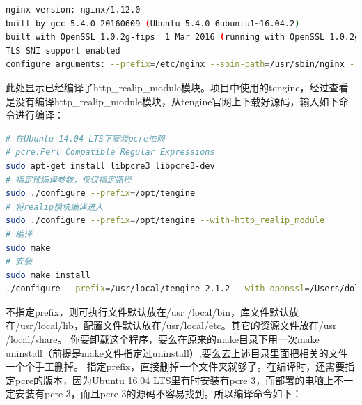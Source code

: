 \documentclass[letter]{book}
\begin{document}
\begin{lstlisting}[language=bash]
nginx version: nginx/1.12.0
built by gcc 5.4.0 20160609 (Ubuntu 5.4.0-6ubuntu1~16.04.2) 
built with OpenSSL 1.0.2g-fips  1 Mar 2016 (running with OpenSSL 1.0.2g  1 Mar 2016)
TLS SNI support enabled
configure arguments: --prefix=/etc/nginx --sbin-path=/usr/sbin/nginx --modules-path=/usr/lib/nginx/modules --conf-path=/etc/nginx/nginx.conf --error-log-path=/var/log/nginx/error.log --http-log-path=/var/log/nginx/access.log --pid-path=/var/run/nginx.pid --lock-path=/var/run/nginx.lock --http-client-body-temp-path=/var/cache/nginx/client_temp --http-proxy-temp-path=/var/cache/nginx/proxy_temp --http-fastcgi-temp-path=/var/cache/nginx/fastcgi_temp --http-uwsgi-temp-path=/var/cache/nginx/uwsgi_temp --http-scgi-temp-path=/var/cache/nginx/scgi_temp --user=nginx --group=nginx --with-compat --with-file-aio --with-threads --with-http_addition_module --with-http_auth_request_module --with-http_dav_module --with-http_flv_module --with-http_gunzip_module --with-http_gzip_static_module --with-http_mp4_module --with-http_random_index_module --with-http_realip_module --with-http_secure_link_module --with-http_slice_module --with-http_ssl_module --with-http_stub_status_module --with-http_sub_module --with-http_v2_module --with-mail --with-mail_ssl_module --with-stream --with-stream_realip_module --with-stream_ssl_module --with-stream_ssl_preread_module --with-cc-opt='-g -O2 -fstack-protector-strong -Wformat -Werror=format-security -Wp,-D_FORTIFY_SOURCE=2 -fPIC' --with-ld-opt='-Wl,-Bsymbolic-functions -Wl,-z,relro -Wl,-z,now -Wl,--as-needed -pie'
\end{lstlisting}

此处显示已经编译了http\_realip\_module模块。项目中使用的tengine，经过查看是没有编译http\_realip\_module模块，从tengine官网上下载好源码，输入如下命令进行编译：

\begin{lstlisting}[language=bash]
# 在Ubuntu 14.04 LTS下安装pcre依赖
# pcre:Perl Compatible Regular Expressions
sudo apt-get install libpcre3 libpcre3-dev
# 指定预编译参数，仅仅指定路径
sudo ./configure --prefix=/opt/tengine
# 将realip模块编译进入
sudo ./configure --prefix=/opt/tengine --with-http_realip_module
# 编译
sudo make
# 安装
sudo make install
./configure --prefix=/usr/local/tengine-2.1.2 --with-openssl=/Users/dolphin/source/openssl
\end{lstlisting}

不指定prefix，则可执行文件默认放在/usr /local/bin，库文件默认放在/usr/local/lib，配置文件默认放在/usr/local/etc。其它的资源文件放在/usr /local/share。
你要卸载这个程序，要么在原来的make目录下用一次make uninstall（前提是make文件指定过uninstall）,要么去上述目录里面把相关的文件一个个手工删掉。
指定prefix，直接删掉一个文件夹就够了。在编译时，还需要指定pcre的版本，因为Ubuntu 16.04 LTS里有时安装有pcre 3，而部署的电脑上不一定安装有pcre 3，而且pcre 3的源码不容易找到。所以编译命令如下：
\end{document}
